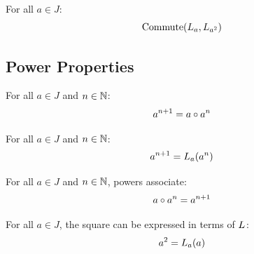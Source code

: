 \begin{corollary}[L\_commute\_L\_sq]
For all $a \in J$:
\[ \mathrm{Commute}(L_{a}, L_{a^{2}}) \]
\end{corollary}

\subsection{Power Properties}

\begin{lemma}
For all $a \in J$ and $n \in \mathbb{N}$:
\[ a^{n+1} = a \circ a^{n} \]
\end{lemma}

\begin{lemma}
For all $a \in J$ and $n \in \mathbb{N}$:
\[ a^{n+1} = L_{a}(a^{n}) \]
\end{lemma}

\begin{lemma}
For all $a \in J$ and $n \in \mathbb{N}$, powers associate:
\[ a \circ a^{n} = a^{n+1} \]
\end{lemma}

\begin{lemma}[jsq\_eq\_L]
For all $a \in J$, the square can be expressed in terms of $L_{}$:
\[ a^{2} = L_{a}(a) \]
\end{lemma}
